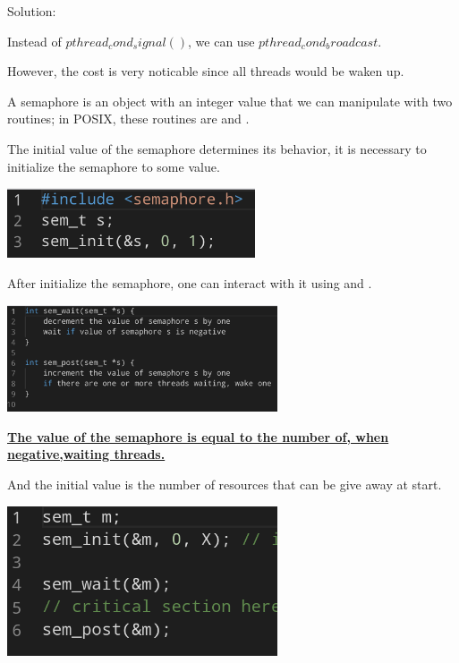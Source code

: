     Solution: 

    Instead of \textbf{$pthread_cond_signal()$}, we can use \textbf{$pthread_cond_broadcast$}.

    However, the cost is very noticable since all threads would be waken up.



    
    A semaphore is an object with an integer value that we can manipulate with 
    two routines; in POSIX, these routines are  and
     .

    The initial value of the semaphore determines its behavior, it is necessary
    to initialize the semaphore to some value.

    \includegraphics[width=0.55\textwidth]{chapters/Cucurrency/Cucurrency/semaphore_init.png}

    After initialize the semaphore, one can interact with it using  and
    .

    \includegraphics[width=0.60\textwidth]{chapters/Cucurrency/Cucurrency/semaphore_routines.png}

    \underline{\textbf{The value of the semaphore is equal to the number of,
    when negative,waiting threads.}}

    And the initial value is the number of resources that can be give away at start.

    \includegraphics[width=0.6\textwidth]{chapters/Cucurrency/Cucurrency/binary_semaphore.png}


